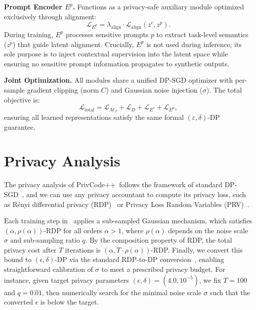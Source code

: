 \documentclass{article}
\theoremstyle{plain}
\theoremstyle{definition}
\theoremstyle{remark}
\def \toolname{PrivCode++}
\begin{document}
{\noindent\textbf{Prompt Encoder $E^p$.} Functions as a privacy-safe auxiliary module optimized exclusively through alignment:
\begin{equation}
\mathcal{L}_{E^p} = \lambda_{\text{align}} \cdot \mathcal{L}_{\text{align}}(z^c, z^p).
\end{equation}
During training, $E^p$ processes sensitive prompts $p$ to extract task-level semantics ($z^p$) that guide latent alignment. Crucially, $E^p$ is not used during inference; its sole purpose is to inject contextual supervision into the latent space while ensuring no sensitive prompt information propagates to synthetic outputs.

\noindent\textbf{Joint Optimization.} All modules share a unified DP-SGD optimizer with per-sample gradient clipping (norm $C$) and Gaussian noise injection ($\sigma$). The total objective is:
\begin{equation}
\mathcal{L}_{\text{total}} = \mathcal{L}_{\mathcal{M}_J} + \mathcal{L}_{D} + \mathcal{L}_{E^c} + \mathcal{L}_{E^p},
\end{equation}
ensuring all learned representations satisfy the same formal $(\varepsilon, \delta)$-DP guarantee.

\section{Privacy Analysis}
\label{app:privacy_analysis}


The privacy analysis of \toolname \ follows the framework of standard DP-SGD~\cite{dpsgd}, and we can use any privacy accountant to compute its privacy loss, such as Rényi differential privacy (RDP)~\cite{DBLP:conf/csfw/Mironov17} or Privacy Loss Random Variables (PRV)~\cite{gopi2021numerical}. 

Each training step in~ applies a sub-sampled Gaussian mechanism, which satisfies $(\alpha, \rho(\alpha))$-RDP for all orders $\alpha > 1$, where $\rho(\alpha)$ depends on the noise scale $\sigma$ and sub-sampling ratio $q$. By the composition property of RDP, the total privacy cost after $T$ iterations is $(\alpha, T \cdot \rho(\alpha))$-RDP. Finally, we convert this bound to $(\epsilon, \delta)$-DP via the standard RDP-to-DP conversion~\cite{DBLP:conf/csfw/Mironov17}, enabling straightforward calibration of $\sigma$ to meet a prescribed privacy budget. For instance, given target privacy parameters $(\epsilon, \delta) = (4.0, 10^{-5})$, we fix $T = 100$ and $q = 0.01$, then numerically search for the minimal noise scale $\sigma$ such that the converted $\epsilon$ is below the target. 

}
\end{document}
